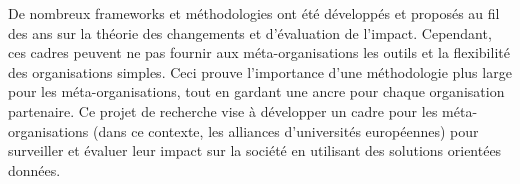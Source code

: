De nombreux frameworks et méthodologies ont été développés et proposés au fil des ans sur la théorie des changements et  d'évaluation de l'impact. Cependant, ces cadres peuvent ne pas fournir aux méta-organisations les outils et la flexibilité des organisations simples. Ceci prouve l'importance d'une méthodologie plus large pour les méta-organisations, tout en gardant une ancre pour chaque organisation partenaire.
Ce projet de recherche vise à développer un cadre pour les méta-organisations (dans ce contexte, les alliances d'universités européennes) pour surveiller et évaluer leur impact sur la société en utilisant des solutions orientées données.